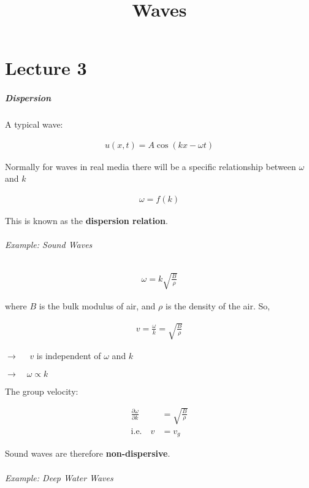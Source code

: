 \documentclass[10pt,a4paper]{article}
\title{Waves}
\begin{document}
\part*{Lecture 3}

\subsubsection*{Dispersion}

A typical wave:

\begin{align*}
u(x, t) = A \cos(kx - \omega t)
\end{align*}

Normally for waves in real media there will be a specific relationship between $\omega$ and $k$

\begin{align*}
\omega = f(k)
\end{align*}

This is known as the \textbf{dispersion relation}.

\paragraph*{Example: Sound Waves}

\begin{align*}
\omega = k \sqrt{\frac{B}{\rho}}
\end{align*}

where $B$ is the bulk modulus of air, and $\rho$ is the density of the air. So,

\begin{align*}
v = \frac{\omega}{k} = \sqrt{\frac{B}{\rho}}
\end{align*}

$\rightarrow \quad$ $v$ is independent of $\omega$ and $k$

$\rightarrow \quad \omega \propto k$

\vspace*{10pt}

The group velocity:

\begin{align*}
\frac{\partial \omega}{\partial k} &= \sqrt{\frac{B}{\rho}} \\
\text{i.e.} \quad v &= v_g
\end{align*}

Sound waves are therefore \textbf{non-dispersive}.

\paragraph*{Example: Deep Water Waves}
\end{document}
